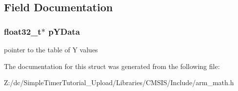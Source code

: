 \subsection{Field Documentation}
\hypertarget{structarm__linear__interp__instance__f32_af1489866b69eb5db1e0afeb24c7b01e9}{
\subsubsection[{p\-Y\-Data}]{\setlength{\rightskip}{0pt plus 5cm}float32\-\_\-t$\ast$ p\-Y\-Data}}\label{structarm__linear__interp__instance__f32_af1489866b69eb5db1e0afeb24c7b01e9}
pointer to the table of Y values 

The documentation for this struct was generated from the following file\-:\begin{DoxyCompactItemize}
\item 
Z\-:/dc/\-Simple\-Timer\-Tutorial\-\_\-\-Upload/\-Libraries/\-C\-M\-S\-I\-S/\-Include/arm\-\_\-math.\-h\end{DoxyCompactItemize}
